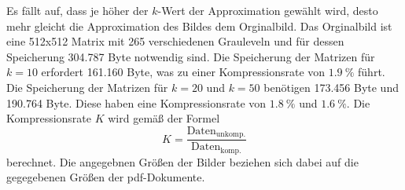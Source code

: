 Es fällt auf, dass je höher der $k$-Wert der Approximation gewählt wird, desto mehr gleicht die Approximation des Bildes dem Orginalbild.
Das Orginalbild ist eine 512x512 Matrix mit 265 verschiedenen Grauleveln und für dessen Speicherung 304.787 Byte notwendig sind.
Die Speicherung der Matrizen für $k=10$ erfordert 161.160 Byte, was zu einer Kompressionsrate von $\SI{1.9}{\percent}$ führt.
Die Speicherung der Matrizen für $k=20$ und $k=50$ benötigen 173.456 Byte und 190.764 Byte. Diese haben eine Kompressionsrate von
$\SI{1.8}{\percent}$ und $\SI{1.6}{\percent}$.
Die Kompressionsrate $K$ wird gemäß der Formel
\begin{equation}
  K=\frac{\text{Daten}_{\text{unkomp.}}}{\text{Daten}_{\text{komp.}}}
\end{equation}
berechnet. Die angegebnen Größen der Bilder beziehen sich dabei auf die gegegebenen Größen der pdf-Dokumente.
